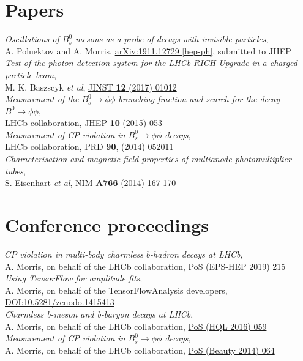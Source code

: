 \section{Papers}
\vspace{0.5em}
\textit{Oscillations of $B_s^0$ mesons as a probe of decays with invisible particles},\\ A. Poluektov and A. Morris, \href{https://arxiv.org/abs/1911.12729}{arXiv:1911.12729 [hep-ph]}, submitted to JHEP\\[1ex]
\textit{Test of the photon detection system for the LHCb RICH Upgrade in a charged particle beam},\\ M. K. Baszscyk \textit{et al}, \href{http://cds.cern.ch/record/2197586}{JINST \textbf{12} (2017) 01012}\\[1ex]
\textit{Measurement of the $B^0_s \to \phi\phi$ branching fraction and search for the decay $B^0 \to \phi \phi$},\\ LHCb collaboration, \href{http://dx.doi.org/10.1007/JHEP10(2015)053}{JHEP \textbf{10} (2015) 053}\\[1ex]
\textit{Measurement of CP violation in $B^0_s \to \phi\phi$ decays},\\ LHCb collaboration, \href{http://dx.doi.org/10.1103/PhysRevD.90.052011}{PRD \textbf{90}, (2014) 052011}\\[1ex]
\textit{Characterisation and magnetic field properties of multianode photomultiplier tubes},\\ S. Eisenhart \textit{et al}, \href{http://dx.doi.org/10.1016/j.nima.2014.05.036}{NIM \textbf{A766} (2014) 167-170}\\[1ex]
\section{Conference proceedings}
\vspace{0.5em}
\textit{$C\!P$ violation in multi-body charmless $b$-hadron decays at LHCb},\\ A. Morris, on behalf of the LHCb collaboration, PoS (EPS-HEP 2019) 215\\[1ex]
\textit{Using TensorFlow for amplitude fits},\\ A. Morris, on behalf of the TensorFlowAnalysis developers, \href{https://doi.org/10.5281/zenodo.1415413}{DOI:10.5281/zenodo.1415413}\\[1ex]
\textit{Charmless b-meson and b-baryon decays at LHCb},\\ A. Morris, on behalf of the LHCb collaboration, \href{https://pos.sissa.it/cgi-bin/reader/contribution.cgi?id=274/059}{PoS (HQL 2016) 059}\\[1ex]
\textit{Measurement of CP violation in $B^0_s \to \phi\phi$ decays},\\ A. Morris, on behalf of the LHCb collaboration, \href{https://pos.sissa.it/cgi-bin/reader/contribution.cgi?id=216/064}{PoS (Beauty 2014) 064}\\[1ex]

